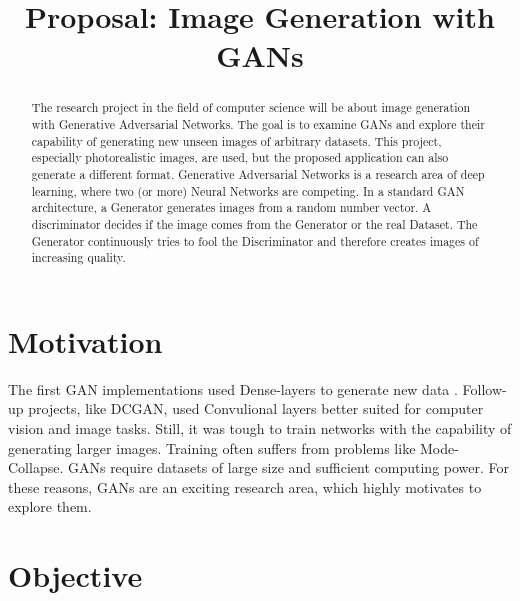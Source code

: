 \documentclass[conference,onecolumn,compsoc]{IEEEtran}
\begin{document}
\title{Proposal: Image Generation with GANs}

\author{
}
\maketitle

\begin{abstract}

\noindent
The research project in the field of computer science will be about image generation with Generative Adversarial Networks. The goal is to examine GANs and explore their capability of generating new unseen images of arbitrary datasets. This project, especially photorealistic images, are used, but the proposed application can also generate a different format. Generative Adversarial Networks is a research area of deep learning, where two (or more) Neural Networks are competing. In a standard GAN architecture, a Generator generates images from a random number vector. A discriminator decides if the image comes from the Generator or the real Dataset. The Generator continuously tries to fool the Discriminator and therefore creates images of increasing quality.

\end{abstract}


\section{Motivation}

\noindent
The first GAN implementations used Dense-layers to generate new data \cite{goodfellow2014generative}. Follow-up projects, like DCGAN, \cite{radford2016unsupervised} used Convulional layers better suited for computer vision and image tasks. Still, it was tough to train networks with the capability of generating larger images. Training often suffers from problems like Mode-Collapse. GANs require datasets of large size and sufficient computing power. For these reasons, GANs are an exciting research area, which highly motivates to explore them.


\section{Objective}
\end{document}
